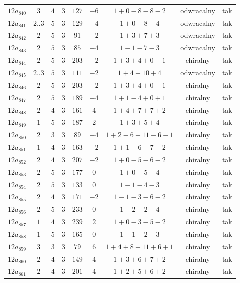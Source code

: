 \begin{longtable}{ccccccccc}
$12a_{840}$ & $3$ & $4$ & $3$ & $127$ & $-6$ & $1+0-8-8-2$ & odwracalny & tak \\
$12a_{841}$ & $2..3$ & $5$ & $3$ & $129$ & $-4$ & $1+0-8-4$ & odwracalny & tak \\
$12a_{842}$ & $2$ & $5$ & $3$ & $91$ & $-2$ & $1+3+7+3$ & odwracalny & tak \\
$12a_{843}$ & $2$ & $5$ & $3$ & $85$ & $-4$ & $1-1-7-3$ & odwracalny & tak \\
$12a_{844}$ & $2$ & $5$ & $3$ & $203$ & $-2$ & $1+3+4+0-1$ & chiralny & tak \\
$12a_{845}$ & $2..3$ & $5$ & $3$ & $111$ & $-2$ & $1+4+10+4$ & odwracalny & tak \\
$12a_{846}$ & $2$ & $5$ & $3$ & $203$ & $-2$ & $1+3+4+0-1$ & chiralny & tak \\
$12a_{847}$ & $2$ & $5$ & $3$ & $189$ & $-4$ & $1+1-4+0+1$ & chiralny & tak \\
$12a_{848}$ & $2$ & $4$ & $3$ & $161$ & $4$ & $1+4+7+7+2$ & chiralny & tak \\
$12a_{849}$ & $1$ & $5$ & $3$ & $187$ & $2$ & $1+3+5+4$ & chiralny & tak \\
$12a_{850}$ & $2$ & $3$ & $3$ & $89$ & $-4$ & $1+2-6-11-6-1$ & chiralny & tak \\
$12a_{851}$ & $1$ & $4$ & $3$ & $163$ & $-2$ & $1+1-6-7-2$ & chiralny & tak \\
$12a_{852}$ & $2$ & $4$ & $3$ & $207$ & $-2$ & $1+0-5-6-2$ & chiralny & tak \\
$12a_{853}$ & $2$ & $5$ & $3$ & $177$ & $0$ & $1+0-5-4$ & chiralny & tak \\
$12a_{854}$ & $2$ & $5$ & $3$ & $133$ & $0$ & $1-1-4-3$ & chiralny & tak \\
$12a_{855}$ & $2$ & $4$ & $3$ & $171$ & $-2$ & $1-1-3-6-2$ & chiralny & tak \\
$12a_{856}$ & $2$ & $5$ & $3$ & $233$ & $0$ & $1-2-2-4$ & chiralny & tak \\
$12a_{857}$ & $1$ & $4$ & $3$ & $239$ & $2$ & $1+0-3-5-2$ & chiralny & tak \\
$12a_{858}$ & $1$ & $5$ & $3$ & $165$ & $0$ & $1-1-2-3$ & chiralny & tak \\
$12a_{859}$ & $3$ & $3$ & $3$ & $79$ & $6$ & $1+4+8+11+6+1$ & chiralny & tak \\
$12a_{860}$ & $2$ & $4$ & $3$ & $149$ & $4$ & $1+3+6+7+2$ & chiralny & tak \\
$12a_{861}$ & $2$ & $4$ & $3$ & $201$ & $4$ & $1+2+5+6+2$ & chiralny & tak \\

\end{longtable}
